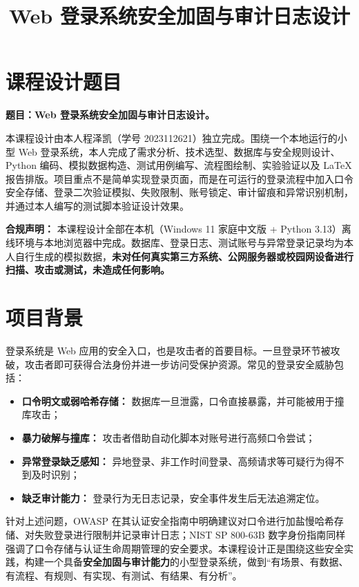 \documentclass[bwprint]{report}
\title{Web 登录系统安全加固与审计日志设计}
\begin{document}
\maketitle

\pagestyle{plain}
\tableofcontents
\newpage
\pagestyle{plain}

\setcounter{page}{1}


\section{课程设计题目}
\textbf{题目：Web 登录系统安全加固与审计日志设计。}

本课程设计由本人程泽凯（学号 2023112621）独立完成。围绕一个本地运行的小型 Web 登录系统，本人完成了需求分析、技术选型、数据库与安全规则设计、Python 编码、模拟数据构造、测试用例编写、流程图绘制、实验验证以及 \LaTeX{} 报告排版。项目重点不是简单实现登录页面，而是在可运行的登录流程中加入口令安全存储、登录二次验证模拟、失败限制、账号锁定、审计留痕和异常识别机制，并通过本人编写的测试脚本验证设计效果。

\textbf{合规声明：} 本课程设计全部在本机（Windows 11 家庭中文版 + Python 3.13）离线环境与本地浏览器中完成。数据库、登录日志、测试账号与异常登录记录均为本人自行生成的模拟数据，\textbf{未对任何真实第三方系统、公网服务器或校园网设备进行扫描、攻击或测试，未造成任何影响。}


\section{项目背景}
登录系统是 Web 应用的安全入口，也是攻击者的首要目标。一旦登录环节被攻破，攻击者即可获得合法身份并进一步访问受保护资源。常见的登录安全威胁包括：

\begin{itemize}
    \item \textbf{口令明文或弱哈希存储：} 数据库一旦泄露，口令直接暴露，并可能被用于撞库攻击；
    \item \textbf{暴力破解与撞库：} 攻击者借助自动化脚本对账号进行高频口令尝试；
    \item \textbf{异常登录缺乏感知：} 异地登录、非工作时间登录、高频请求等可疑行为得不到及时识别；
    \item \textbf{缺乏审计能力：} 登录行为无日志记录，安全事件发生后无法追溯定位。
\end{itemize}

针对上述问题，OWASP 在其认证安全指南中明确建议对口令进行加盐慢哈希存储、对失败登录进行限制并记录审计日志\cite{owasp2021authn}；NIST SP 800-63B 数字身份指南同样强调了口令存储与认证生命周期管理的安全要求\cite{nist2020sp80063b}。本课程设计正是围绕这些安全实践，构建一个具备\textbf{安全加固与审计能力}的小型登录系统，做到“有场景、有数据、有流程、有规则、有实现、有测试、有结果、有分析”。
\end{document}
